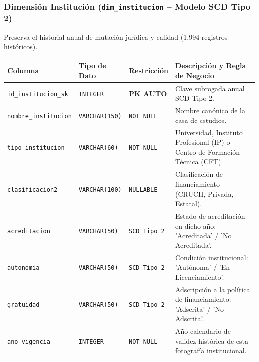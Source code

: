 \documentclass[11pt,a4paper]{article}
\begin{document}
\subsubsection{Dimensión Institución (\texttt{dim\_institucion} -- Modelo SCD Tipo 2)}
Preserva el historial anual de mutación jurídica y calidad (1.994 registros históricos).
\begin{table}[h!]
\centering
\small
\begin{tabularx}{\textwidth}{lXlX}
\toprule
\textbf{Columna} & \textbf{Tipo de Dato} & \textbf{Restricción} & \textbf{Descripción y Regla de Negocio} \\
\midrule
\texttt{id\_institucion\_sk} & \texttt{INTEGER} & \textbf{PK AUTO} & Clave subrogada anual SCD Tipo 2. \\
\texttt{nombre\_institucion} & \texttt{VARCHAR(150)} & \texttt{NOT NULL} & Nombre canónico de la casa de estudios. \\
\texttt{tipo\_institucion} & \texttt{VARCHAR(60)} & \texttt{NOT NULL} & Universidad, Instituto Profesional (IP) o Centro de Formación Técnica (CFT). \\
\texttt{clasificacion2} & \texttt{VARCHAR(100)} & \texttt{NULLABLE} & Clasificación de financiamiento (CRUCH, Privada, Estatal). \\
\texttt{acreditacion} & \texttt{VARCHAR(50)} & \texttt{SCD Tipo 2} & Estado de acreditación en dicho año: 'Acreditada' / 'No Acreditada'. \\
\texttt{autonomia} & \texttt{VARCHAR(50)} & \texttt{SCD Tipo 2} & Condición institucional: 'Autónoma' / 'En Licenciamiento'. \\
\texttt{gratuidad} & \texttt{VARCHAR(50)} & \texttt{SCD Tipo 2} & Adscripción a la política de financiamiento: 'Adscrita' / 'No Adscrita'. \\
\texttt{ano\_vigencia} & \texttt{INTEGER} & \texttt{NOT NULL} & Año calendario de validez histórica de esta fotografía institucional. \\
\bottomrule
\end{tabularx}
\end{table}
\end{document}
